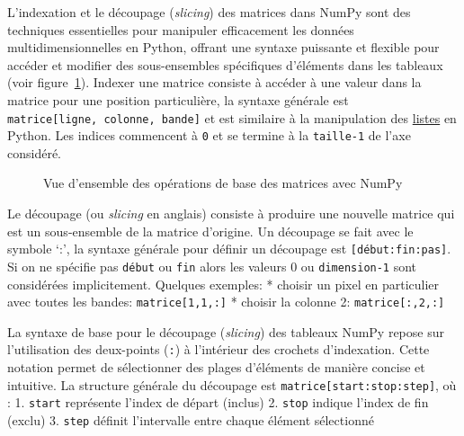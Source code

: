 \documentclass[
  11pt,
  letterpaper,
  open=any,
  twoside=false,
  french]{scrbook}
\begin{document}
L'indexation et le découpage (\emph{slicing}) des matrices dans NumPy
sont des techniques essentielles pour manipuler efficacement les données
multidimensionnelles en Python, offrant une syntaxe puissante et
flexible pour accéder et modifier des sous-ensembles spécifiques
d'éléments dans les tableaux (voir figure~\ref{fig-naturenumpy2}).
Indexer une matrice consiste à accéder à une valeur dans la matrice pour
une position particulière, la syntaxe générale est
\texttt{matrice{[}ligne,\ colonne,\ bande{]}} et est similaire à la
manipulation des
\href{https://docs.python.org/fr/3/tutorial/introduction.html\#lists}{listes}
en Python. Les indices commencent à \texttt{0} et se termine à la
\texttt{taille-1} de l'axe considéré.

\begin{figure}


\caption{\label{fig-naturenumpy2}Vue d'ensemble des opérations de base
des matrices avec NumPy}

\end{figure}%

Le découpage (ou \emph{slicing} en anglais) consiste à produire une
nouvelle matrice qui est un sous-ensemble de la matrice d'origine. Un
découpage se fait avec le symbole `:', la syntaxe générale pour définir
un découpage est \texttt{{[}début:fin:pas{]}}. Si on ne spécifie pas
\texttt{début} ou \texttt{fin} alors les valeurs 0 ou
\texttt{dimension-1} sont considérées implicitement. Quelques exemples:
* choisir un pixel en particulier avec toutes les bandes:
\texttt{matrice{[}1,1,:{]}} * choisir la colonne 2:
\texttt{matrice{[}:,2,:{]}}

La syntaxe de base pour le découpage (\emph{slicing}) des tableaux NumPy
repose sur l'utilisation des deux-points (\texttt{:}) à l'intérieur des
crochets d'indexation. Cette notation permet de sélectionner des plages
d'éléments de manière concise et intuitive. La structure générale du
découpage est \texttt{matrice{[}start:stop:step{]}}, où : 1.
\texttt{start} représente l'index de départ (inclus) 2. \texttt{stop}
indique l'index de fin (exclu) 3. \texttt{step} définit l'intervalle
entre chaque élément sélectionné
\end{document}
